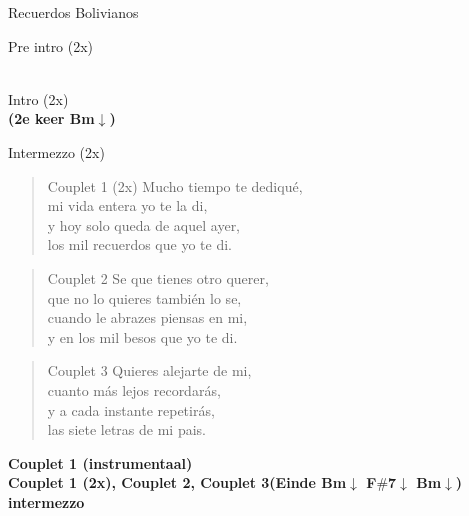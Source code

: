 \begin{song}[huayno]{Recuerdos Bolivianos}

\begin{instrumental}{Pre intro (2x)}
   \\
   \\
\end{instrumental}

\begin{instrumental}{Intro (2x)}
   \\
   
\textbf{(2e keer Bm$\downarrow$)}\\
\end{instrumental}

\begin{instrumental}{Intermezzo (2x)}
    \\
    
\end{instrumental}

\begin{verse}{Couplet 1 (2x)}
Mucho tiempo te dediqué,\\
mi vida entera yo te la di,\\
y hoy solo queda de aquel ayer,\\
los mil recuerdos que yo te di.
\end{verse}

\begin{verse}{Couplet 2}
Se que tienes otro querer,\\
que no lo quieres también lo se,\\
cuando le abrazes piensas en mi,\\
y en los mil besos que yo te di.
\end{verse}
\clearpage
\begin{verse}{Couplet 3}
Quieres alejarte de mi,\\
cuanto más lejos recordarás,\\
y a cada instante repetirás,\\
las siete letras de mi pais.
\end{verse}

\textbf{Couplet 1 (instrumentaal)}\\
\textbf{Couplet 1 (2x), Couplet 2, Couplet 3(Einde Bm$\downarrow$ F$\#$7$\downarrow$ Bm$\downarrow$)}\\
\textbf{intermezzo}

\end{song}
